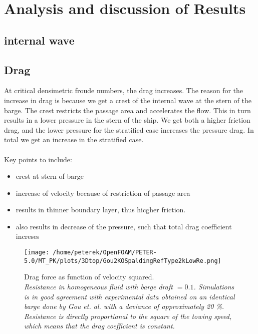 \documentclass[a4paper, 12pt]{report}
\begin{document}
\chapter{Analysis and discussion of Results}
\section{internal wave}

\section{Drag}
At critical densimetric froude numbers, the drag increases. The reason for the increase in drag is because we get a crest of the internal wave at the stern of the barge. The crest restricts the passage area and accelerates the flow. This in turn results in a lower pressure in the stern of the ship. We get both a higher friction drag, and the lower pressure for the stratified case increases the pressure drag. In total we get an increase in the stratified case.\\
\\ 
Key points to include:
\begin{itemize}
	\item crest at stern of barge
	\item increase of velocity because of restriction of passage area
	\item results in thinner boundary layer, thus hicgher friction.
	\item also results in decrease of the pressure, such that total drag coefficient increses
\end{itemize}

\begin{figure}[H]
	\centering
	\texttt{[image: /home/peterek/OpenFOAM/PETER-5.0/MT\_PK/plots/3Dtop/Gou2KOSpaldingRefType2kLowRe.png]}
	\caption{Drag force as function of velocity squared. \\ \textit{Resistance in homogeneous fluid with barge draft $=0.1$. Simulations is in good agreement with experimental data obtained on an identical barge done by Gou et. al. \cite{Gou} with a deviance of approximately 20 \%. Resistance is directly proportianal to the square of the towing speed, which means that the drag coefficient is constant. }}
	\label{fig:dragForce}
\end{figure}
\end{document}
